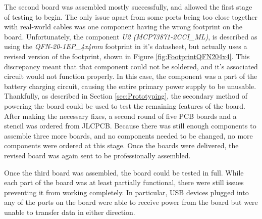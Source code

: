The second board was assembled mostly successfully, and allowed the first stage of testing to begin.
The only issue apart from some ports being too close together with real-world cables was one component having the wrong footprint on the board.
Unfortunately, the component \emph{U2 (MCP73871-2CCI\_ML)}, is described as using the \emph{QFN-20-1EP\_4x4mm} footprint in it's datasheet, but actually uses a revised version of the footprint, shown in Figure \ref{fig:FootprintQFN204x4}.
This discrepancy meant that that component could not be soldered, and it's associated circuit would not function properly.
In this case, the component was a part of the battery charging circuit, causing the entire primary power supply to be unusable.
Thankfully, as described in Section \ref{sec:Prototyping}, the secondary method of powering the board could be used to test the remaining features of the board.
After making the necessary fixes, a second round of five PCB boards and a stencil was ordered from JLCPCB.
Because there was still enough components to assemble three more boards, and no components needed to be changed, no more components were ordered at this stage.
Once the boards were delivered, the revised board was again sent to be professionally assembled.

Once the third board was assembled, the board could be tested in full.
While each part of the board was at least partially functional, there were still issues preventing it from working completely.
In particular, USB devices plugged into any of the ports on the board were able to receive power from the board but were unable to transfer data in either direction.
